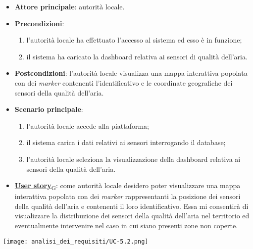 \begin{itemize}
	\item \textbf{Attore principale}: autorità locale.
	\item \textbf{Precondizioni}:
	      \begin{enumerate}
		      \item l'autorità locale ha effettuato l'accesso al sistema ed esso è in funzione;
		      \item il sistema ha caricato la dashboard relativa ai sensori di qualità dell'aria.
	      \end{enumerate}
	\item \textbf{Postcondizioni}: l'autorità locale visualizza una mappa interattiva popolata con dei \textit{marker} contenenti l'identificativo e le coordinate geografiche dei sensori della qualità dell'aria.
	\item \textbf{Scenario principale}:
	      \begin{enumerate}
		      \item l'autorità locale accede alla piattaforma;
		      \item il sistema carica i dati relativi ai sensori interrogando il database;
		      \item l'autorità locale seleziona la visualizzazione della dashboard relativa ai sensori della qualità dell'aria.
	      \end{enumerate}
	\item \href{https://7last.github.io/docs/rtb/documentazione-interna/glossario\#user-story}{\textbf{User story}\textsubscript{G}}:
	      come autorità locale desidero poter visualizzare una mappa interattiva popolata con dei \textit{marker} rappresentanti la posizione dei sensori della qualità dell'aria
	      e contenenti il loro identificativo. Essa mi consentirà di visualizzare la distribuzione dei sensori della qualità dell'aria nel territorio ed eventualmente intervenire nel caso in cui siano presenti zone non coperte.
\end{itemize}
\begin{center}
	\texttt{[image: analisi\_dei\_requisiti/UC-5.2.png]}
\end{center}



